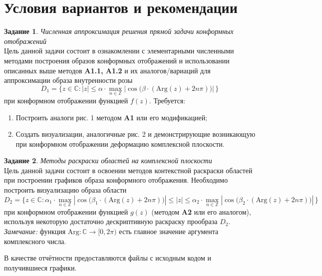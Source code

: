 \documentclass{article}
\theoremstyle{definition}
\newtheorem{task}{Задание}
\begin{document}
\section{Условия вариантов и рекомендации}
\begin{task}
\textit{Численная аппроксимация решения прямой задачи конформных отображений} \\
Цель данной задачи состоит в ознакомлении с элементарными численными методами построения образов конформных отображений и использовании описанных выше методов \textbf{A1.1, A1.2} и их аналогов/вариаций для аппроксимации образа внутренности розы
\begin{equation*}
D_1 = \bigl\{ z\in\mathbb{C}: |z|\leq \alpha\cdot \max_{n\in\mathbb{Z}}|\cos\bigl(\beta\cdot (\textrm{Arg}(z) + 2n\pi)\bigr)|\, \bigr\}
\end{equation*} при конформном отображении функцией $f(z)$. Требуется:
\begin{enumerate}
\item Построить аналоги рис. 1 методом \textbf{A1} или его модификацией;
\item Создать визуализации, аналогичные рис. 2 и демонстрирующие возникающую при конформном отображении деформацию комплексной плоскости.
\end{enumerate}
\end{task} \vspace{0.1cm}
\begin{task}
\textit{Методы раскраски областей на комплексной плоскости} \\
Цель данной задачи состоит в освоении методов контекстной раскраски областей при построении графиков образа конформного отображения. Необходимо построить визуализацию образа области 
\begin{equation*}
D_2 = \bigl\{ z\in\mathbb{C}: \alpha_1\cdot \max_{n\in\mathbb{Z}}|\cos\bigl(\beta_1\cdot (\textrm{Arg}(z) + 2n\pi)\bigr)| \leq 
|z|\leq \alpha_2\cdot \max_{n\in\mathbb{Z}}|\cos\bigl(\beta_2 \cdot(\textrm{Arg}(z) + 2n\pi)\bigr)|\, \bigr\}
\end{equation*} при конформном отображении функцией $g(z)$ (методом \textbf{A2} или его аналогом), используя некоторую достаточно дескриптивную раскраску прообраза $D_2$. \\
\textit{Замечание:} функция $\textrm{Arg}: \mathbb{C}\rightarrow [0,2\pi)$ есть главное значение аргумента комплексного числа.
\end{task}
В качестве отчётности предоставляются файлы с исходным кодом и получившиеся графики.
\vspace{0.6cm}
\end{document}
